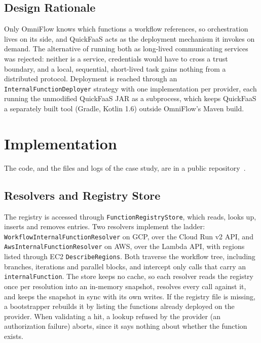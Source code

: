 \documentclass[conference]{IEEEtran}
\begin{document}
\subsection{Design Rationale}
Only OmniFlow knows which functions a workflow references, so orchestration lives on its side, and
QuickFaaS acts as the deployment mechanism it invokes on demand. The alternative of running both as
long-lived communicating services was rejected: neither is a service, credentials would have to
cross a trust boundary, and a local, sequential, short-lived task gains nothing from a distributed
protocol. Deployment is reached through an \texttt{InternalFunctionDeployer} strategy with one
implementation per provider, each running the unmodified QuickFaaS JAR as a subprocess, which keeps
QuickFaaS a separately built tool (Gradle, Kotlin 1.6) outside OmniFlow's Maven build.

\section{Implementation}
\label{sec:impl}

The code, and the files and logs of the case study, are in a public
repository~\cite{carvalho2026repository}.

\subsection{Resolvers and Registry Store}
The registry is accessed through \texttt{FunctionRegistryStore}, which reads, looks up, inserts
and removes entries. Two resolvers implement the ladder: \texttt{WorkflowInternalFunctionResolver}
on GCP, over the Cloud Run v2 API, and \texttt{AwsInternalFunctionResolver} on AWS, over the Lambda
API, with regions listed through EC2 \texttt{DescribeRegions}. Both traverse the workflow tree,
including branches, iterations and parallel blocks, and intercept only calls that carry an
\texttt{internalFunction}. The store keeps no cache, so each resolver reads the registry once per
resolution into an in-memory snapshot, resolves every call against it, and keeps the snapshot in
sync with its own writes. If the registry file is missing, a bootstrapper rebuilds it by listing the
functions already deployed on the provider. When validating a hit, a lookup refused by the provider
(an authorization failure) aborts, since it says nothing about whether the function exists.
\end{document}
